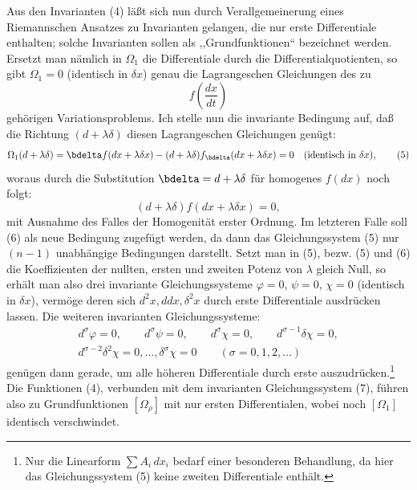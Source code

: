 Aus den Invarianten (4) läßt sich nun durch Verallgemeinerung eines
Riemannschen Ansatzes zu Invarianten gelangen, die nur erste
Differentiale enthalten; solche Invarianten sollen als
,,Grundfunktionen`` bezeichnet werden. Ersetzt man nämlich in
\(\Omega_1\) die Differentiale durch die Differentialquotienten, so gibt
\(\Omega_1=0\) (identisch in \(\delta x\)) genau die Lagrangeschen
Gleichungen des zu
\[
f\!\left(\frac{dx}{dt}\right)
\]
gehörigen Variationsproblems. Ich stelle nun die invariante Bedingung
auf, daß die Richtung \((d+\lambda\delta)\) diesen Lagrangeschen
Gleichungen genügt:
\begin{equation}
\Omega_1(d+\lambda\delta)=
\bdelta f(dx+\lambda\delta x)
-(d+\lambda\delta)f_{\bdelta}(dx+\lambda\delta x)=0
\quad(\text{identisch in }\delta x),
\tag{5}
\end{equation}
woraus durch die Substitution \(\bdelta=d+\lambda\delta\) für
homogenes \(f(dx)\) noch folgt:
\begin{equation}
(d+\lambda\delta)f(dx+\lambda\delta x)=0,
\tag{6}
\end{equation}
mit Ausnahme des Falles der Homogenität erster Ordnung. Im letzteren
Falle soll (6) als neue Bedingung zugefügt werden, da dann das
Gleichungssystem (5) nur \((n-1)\) unabhängige Bedingungen darstellt.
Setzt man in (5), bezw. (5) und (6) die Koeffizienten der nullten,
ersten und zweiten Potenz von \(\lambda\) gleich Null, so erhält man
also drei invariante Gleichungssysteme
\(\varphi=0\), \(\psi=0\), \(\chi=0\) (identisch in \(\delta x\)),
vermöge deren sich \(d^2x,ddx,\delta^2x\) durch erste Differentiale
ausdrücken lassen. Die weiteren invarianten Gleichungssysteme:
\begin{equation}
\begin{gathered}
d^\sigma\varphi=0,\qquad d^\sigma\psi=0,\qquad
d^\sigma\chi=0,\qquad d^{\sigma-1}\delta\chi=0,\\
d^{\sigma-2}\delta^2\chi=0,\ldots,\delta^\sigma\chi=0
\qquad(\sigma=0,1,2,\ldots)
\end{gathered}
\tag{7}
\end{equation}
genügen dann gerade, um alle höheren Differentiale durch erste
auszudrücken.\footnote{Nur die Linearform \(\sum A_i\,dx_i\) bedarf
einer besonderen Behandlung, da hier das Gleichungssystem (5) keine
zweiten Differentiale enthält.} Die Funktionen (4), verbunden mit dem
invarianten Gleichungssystem (7), führen also zu Grundfunktionen
\([\Omega_\rho]\) mit nur ersten Differentialen, wobei noch
\([\Omega_1]\) identisch verschwindet.

